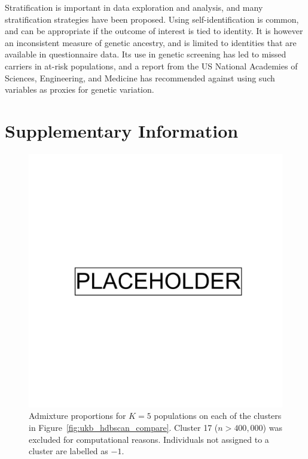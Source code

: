 Stratification is important in data exploration and analysis, and many stratification strategies have been proposed. Using self-identification is common, and can be appropriate if the outcome of interest is tied to identity. It is however an inconsistent measure of genetic ancestry, and is limited to identities that are available in questionnaire data. Its use in genetic screening has led to missed carriers in at-risk populations\citep{kaseniit_genetic_2020}, and a report from the US National Academies of Sciences, Engineering, and Medicine has recommended against using such variables as proxies for genetic variation\citep{committee_2023}. 


\clearpage

\section{Supplementary Information}

\begin{figure}[ht]
  \centering
    \includegraphics[width=0.8\linewidth]{placeholder.png}
    \caption[Admixture proportions for 5 populations]{Admixture proportions for $K=5$ populations on each of the clusters in Figure~\ref{fig:ukb_hdbscan_compare}. Cluster 17 ($n>400,000$) was excluded for computational reasons. Individuals not assigned to a cluster are labelled as $-1$.}
  \label{fig:supp_ukb_admix}
\end{figure}

